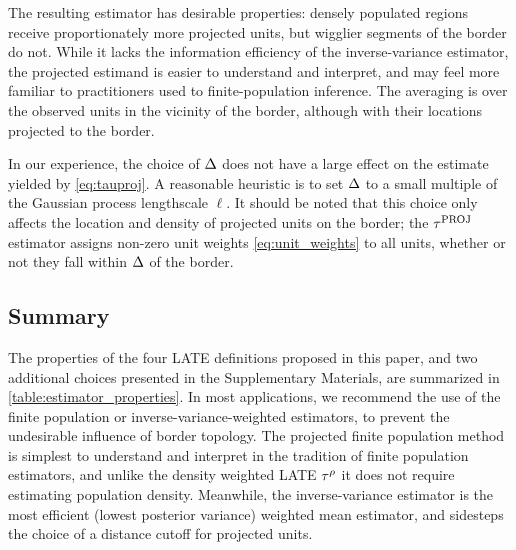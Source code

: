 \documentclass[12pt]{article}
\begin{document}
The resulting estimator has desirable properties: densely populated regions receive proportionately more projected units, but wigglier segments of the border do not.
While it lacks the information efficiency of the inverse-variance estimator,
the projected estimand is easier to understand and interpret,
and may feel more familiar to practitioners used to finite-population inference.
The averaging is over the observed units in the vicinity of the border, although with their locations projected to the border.

In our experience, the choice of \(\Delta\) does not have a large effect on the estimate yielded by \autoref{eq:tauproj}.
A reasonable heuristic is to set \(\Delta\) to a small multiple of the Gaussian process lengthscale \(\ell\).
It should be noted that this choice only affects the location and density of projected units on the border; the \(\tau^{\mathrm{PROJ}}\) estimator assigns non-zero unit weights \autoref{eq:unit_weights} to all units, whether or not they fall within \(\Delta\) of the border.

\subsection{Summary}
\label{sec:summary}

The properties of the four LATE definitions proposed in this paper, and two additional choices presented in the Supplementary Materials, are summarized in \autoref{table:estimator_properties}.
In most applications, we recommend the use of the finite population or inverse-variance-weighted estimators, to prevent the undesirable influence of border topology.
The projected finite population method is simplest to understand and interpret in the tradition of finite population estimators, and unlike the density weighted LATE \(\tau^{\rho}\) it does not require estimating population density.
Meanwhile, the inverse-variance estimator is the most efficient (lowest posterior variance) weighted mean estimator,
and sidesteps the choice of a distance cutoff for projected units.
\end{document}
